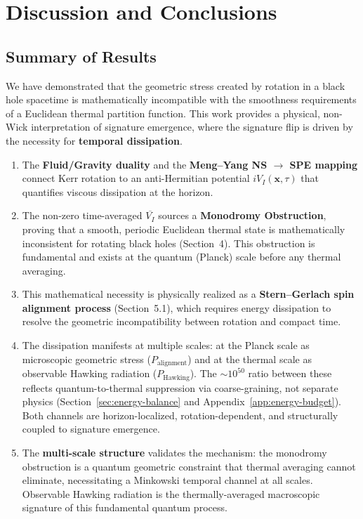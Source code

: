 \documentclass[11pt]{article}
\begin{document}
\section{Discussion and Conclusions}

\subsection{Summary of Results}

We have demonstrated that the geometric stress created by rotation in a black hole 
spacetime is mathematically incompatible with the smoothness requirements of a 
Euclidean thermal partition function. This work provides a physical, non-Wick 
interpretation of signature emergence, where the signature flip is driven by the 
necessity for \textbf{temporal dissipation}.

\begin{enumerate}
\item The \textbf{Fluid/Gravity duality} and the \textbf{Meng--Yang NS $\to$ SPE 
mapping} connect Kerr rotation to an anti-Hermitian potential $iV_I(\mathbf{x}, \tau)$ 
that quantifies viscous dissipation at the horizon.

\item The non-zero time-averaged $\overline{V_I}$ sources a \textbf{Monodromy 
Obstruction}, proving that a smooth, periodic Euclidean thermal state is 
mathematically inconsistent for rotating black holes (Section~4). This obstruction 
is fundamental and exists at the quantum (Planck) scale before any thermal averaging.

\item This mathematical necessity is physically realized as a \textbf{Stern--Gerlach 
spin alignment process} (Section~5.1), which requires energy dissipation to resolve 
the geometric incompatibility between rotation and compact time.

\item The dissipation manifests at multiple scales: at the Planck scale as microscopic 
geometric stress ($P_{\text{alignment}}$) and at the thermal scale as observable 
Hawking radiation ($P_{\text{Hawking}}$). The $\sim 10^{50}$ ratio between these 
reflects quantum-to-thermal suppression via coarse-graining, not separate physics 
(Section~\ref{sec:energy-balance} and Appendix~\ref{app:energy-budget}). Both channels 
are horizon-localized, rotation-dependent, and structurally coupled to signature 
emergence.

\item The \textbf{multi-scale structure} validates the mechanism: the monodromy 
obstruction is a quantum geometric constraint that thermal averaging cannot eliminate, 
necessitating a Minkowski temporal channel at all scales. Observable Hawking radiation 
is the thermally-averaged macroscopic signature of this fundamental quantum process.
\end{enumerate}
\end{document}
